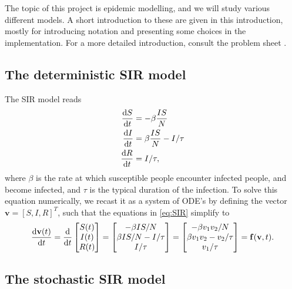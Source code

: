 The topic of this project is epidemic modelling, and we will study various different models. A short introduction to these are given in this introduction, mostly for introducing notation and presenting some choices in the implementation. For a more detailed introduction, consult the problem sheet \cite{sheet}.

\subsection{The deterministic SIR model}
The SIR model reads 
\begin{subequations}\label{eq:SIR}
\begin{align}
	\frac{\text{d} S}{\text{d} t} &= - \beta \frac{I S}{N}\\
	\frac{\text{d} I}{\text{d} t} &= \beta \frac{IS }{N} - I/\tau \\
	\frac{\text{d} R}{\text{d} t} &= I/\tau, 
\end{align}
\end{subequations}
where $\beta$ is the rate at which susceptible people encounter infected people, and become infected, and $\tau$ is the typical duration of the infection. To solve this equation numerically, we recast it as a system of ODE's by defining the vector $\mathbf{v} = [S,I,R]^T$, such that the equations in \ref{eq:SIR} simplify to
\begin{equation}
	\frac{\text{d} \mathbf{v}(t)}{\text{d} t} = \frac{\mathrm{d}}{\mathrm{d}t} \begin{bmatrix}
		S(t) \\
		I(t) \\
		R(t)
	\end{bmatrix}
	= \begin{bmatrix}
		- \beta IS/N \\
		\beta  IS/N - I/\tau \\
		I/\tau
	\end{bmatrix} = \begin{bmatrix}
		-\beta v_1 v_2 /N \\
		\beta v_1 v_2 - v_2/\tau \\
		v_1 / \tau
	\end{bmatrix}= \mathbf{f}(\mathbf{v},t).
\end{equation}

\subsection{The stochastic SIR model}

